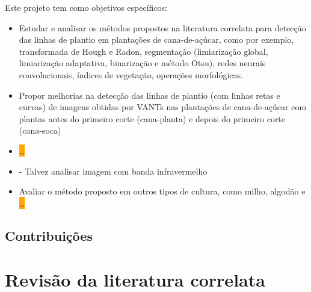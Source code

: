 \documentclass[12pt, a4paper, english, brazil]{article}
\newcommand{\textRed}[1]{{{\color{red} #1}}}
\newcommand{\dotsBlue}{\colorbox{orange}{\textcolor{blue}{\dots}}}
\begin{document}
Este projeto tem como objetivos específicos:
\begin{itemize}
    \item Estudar e analisar os métodos propostos na literatura correlata para detecção das linhas de plantio em plantações de cana-de-açúcar, como por exemplo, transformada de Hough e Radon, segmentação (limiarização global, limiarização adaptativa, binarização e método Otsu), redes neurais convolucionais, índices de vegetação, operações morfológicas.
    \item Propor melhorias na detecção das linhas de plantio (com linhas retas e curvas) de imagens obtidas por VANTs nas plantações de cana-de-açúcar com plantas antes do primeiro corte (cana-planta) e depois do primeiro corte (cana-soca)
    \item \dotsBlue
    \item - \textRed{Talvez analisar imagem com banda infravermelho}
    \item Avaliar o método proposto em outros tipos de cultura, como milho, algodão e \dotsBlue
\end{itemize}


\subsection{Contribuições}

\section{Revisão da literatura correlata}
\end{document}
